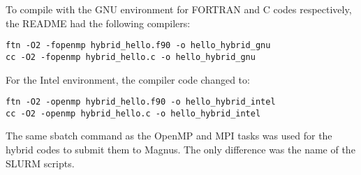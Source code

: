 To compile with the GNU environment for FORTRAN and C codes respectively, the README had the following compilers:

\begin{tcolorbox}
\begin{Verbatim}[fontsize=\scriptsize]
ftn -O2 -fopenmp hybrid_hello.f90 -o hello_hybrid_gnu
cc -O2 -fopenmp hybrid_hello.c -o hello_hybrid_gnu
\end{Verbatim}
\end{tcolorbox}

For the Intel environment, the compiler code changed to:

\begin{tcolorbox}
\begin{Verbatim}[fontsize=\scriptsize]
ftn -O2 -openmp hybrid_hello.f90 -o hello_hybrid_intel
cc -O2 -openmp hybrid_hello.c -o hello_hybrid_intel
\end{Verbatim}
\end{tcolorbox}

The same sbatch command as the OpenMP and MPI tasks was used for the hybrid codes to submit them to Magnus. The only difference was the name of the 
SLURM scripts.
